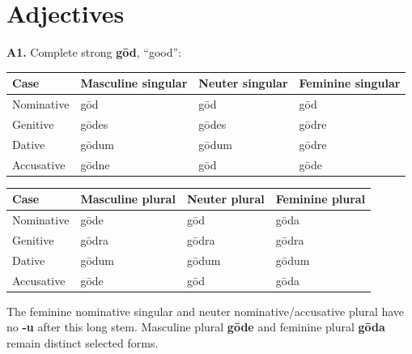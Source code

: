 \section*{Adjectives}

\par\begin{minipage}{\linewidth}\raggedright
\textbf{A1.} Complete strong \textbf{gōd}, “good”:

\par\begingroup
\fontsize{10.5}{13.2}\selectfont
\setlength{\LTleft}{0pt}\setlength{\LTright}{\fill}
\noindent
\begin{tabular}{@{}>{\raggedright\arraybackslash}p{22.0mm}>{\raggedright\arraybackslash}p{31.188mm}>{\raggedright\arraybackslash}p{31.188mm}>{\raggedright\arraybackslash}p{31.188mm}@{}}
\toprule
\textbf{Case} & \textbf{Masculine singular} & \textbf{Neuter singular} & \textbf{Feminine singular} \\
\midrule
Nominative & gōd & gōd & gōd \\
Genitive & gōdes & gōdes & gōdre \\
Dative & gōdum & gōdum & gōdre \\
Accusative & gōdne & gōd & gōde \\
\bottomrule
\end{tabular}
\par\endgroup
\par\addvspace{5pt}
\par\begingroup
\fontsize{10.5}{13.2}\selectfont
\setlength{\LTleft}{0pt}\setlength{\LTright}{\fill}
\noindent
\begin{tabular}{@{}>{\raggedright\arraybackslash}p{22.0mm}>{\raggedright\arraybackslash}p{31.188mm}>{\raggedright\arraybackslash}p{31.188mm}>{\raggedright\arraybackslash}p{31.188mm}@{}}
\toprule
\textbf{Case} & \textbf{Masculine plural} & \textbf{Neuter plural} & \textbf{Feminine plural} \\
\midrule
Nominative & gōde & gōd & gōda \\
Genitive & gōdra & gōdra & gōdra \\
Dative & gōdum & gōdum & gōdum \\
Accusative & gōde & gōd & gōda \\
\bottomrule
\end{tabular}
\par\endgroup
The feminine nominative singular and neuter nominative/\allowbreak{}accusative plural have no \textbf{-u} after this long stem. Masculine plural \textbf{gōde} and feminine plural \textbf{gōda} remain distinct selected forms.

\end{minipage}\par\addvspace{4pt}

